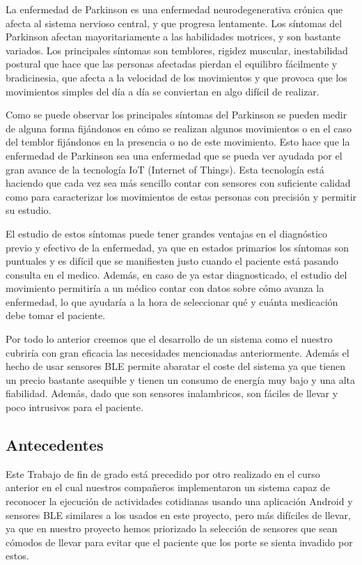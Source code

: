 \documentclass[11pt,spanish]{article}
\begin{document}
La enfermedad de Parkinson es una enfermedad neurodegenerativa crónica que afecta al sistema nervioso central, y que progresa lentamente. Los síntomas del Parkinson afectan mayoritariamente a las habilidades motrices, y son bastante variados. Los principales síntomas son temblores, rigidez muscular, inestabilidad postural que hace que las personas afectadas pierdan el equilibro fácilmente y bradicinesia, que afecta a la velocidad de los movimientos y que provoca que los movimientos simples del día a día se conviertan en algo difícil de realizar.
\newline

Como se puede observar los principales síntomas del Parkinson se pueden medir de alguna forma fijándonos en cómo se realizan algunos movimientos o en el caso del temblor fijándonos en la presencia o no de este movimiento. Esto hace que la enfermedad de Parkinson sea una enfermedad que se pueda ver ayudada por el gran avance de la tecnología IoT (Internet of Things). Esta tecnología está haciendo que cada vez sea más sencillo contar con sensores con suficiente calidad como para caracterizar los movimientos de estas personas con precisión y permitir su estudio.
\newline

El estudio de estos síntomas puede tener grandes ventajas en el diagnóstico previo y efectivo de la enfermedad, ya que en estados primarios los síntomas son puntuales y es difícil que se manifiesten justo cuando el paciente está pasando consulta en el medico. Además, en caso de ya estar diagnosticado, el estudio del movimiento permitiría a un médico contar con datos sobre cómo avanza la enfermedad, lo que ayudaría a la hora de seleccionar qué y cuánta medicación debe tomar el paciente.
\newline

Por todo lo anterior creemos que el desarrollo de un sistema como el nuestro cubriría con gran eficacia las necesidades mencionadas anteriormente. Además el hecho de usar sensores BLE permite abaratar el coste del sistema ya que tienen un precio bastante asequible y tienen un consumo de energía muy bajo y una alta fiabilidad. Además, dado que son sensores inalambricos, son fáciles de llevar y poco intrusivos para el paciente.

\subsection{Antecedentes}

Este Trabajo de fin de grado está precedido por otro realizado en el curso anterior \cite{TFG_Anterior}  en el cual nuestros compañeros implementaron un sistema capaz de reconocer la ejecución de actividades cotidianas usando una aplicación Android y sensores BLE similares a los usados en este proyecto, pero más difíciles de llevar, ya que en nuestro proyecto hemos priorizado la selección de sensores que sean cómodos de llevar para evitar que el paciente que los porte se sienta invadido por estos. 
\newline
\end{document}
